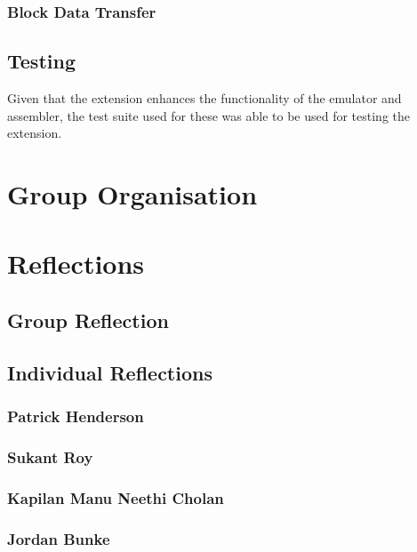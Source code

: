 \documentclass[11pt]{article}
\begin{document}
\subsubsection{Block Data Transfer}

\subsection{Testing}

Given that the extension enhances the functionality of the emulator and assembler, the test suite used for these was able to be used for testing the extension. 

\section{Group Organisation}

\section{Reflections}

\subsection{Group Reflection}

\subsection{Individual Reflections}

\subsubsection{Patrick Henderson}

\subsubsection{Sukant Roy}

\subsubsection{Kapilan Manu Neethi Cholan}

\subsubsection{Jordan Bunke}
\end{document}
